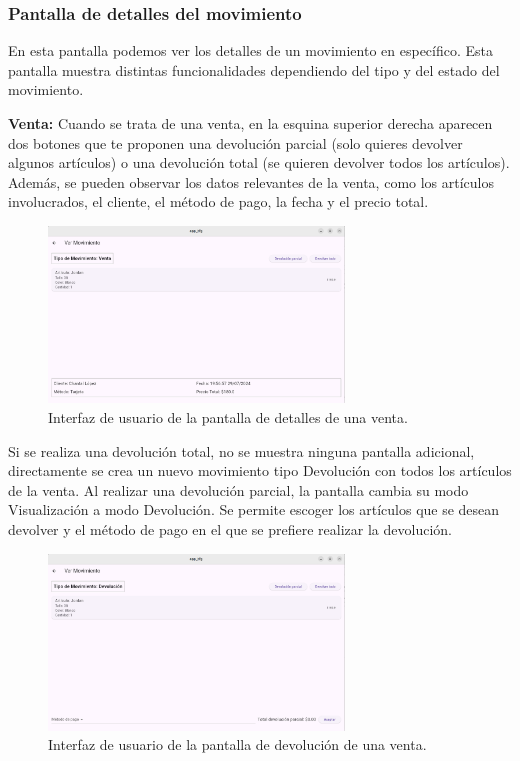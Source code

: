 \subsubsection{Pantalla de detalles del movimiento}

En esta pantalla podemos ver los detalles de un movimiento en específico. Esta pantalla muestra distintas funcionalidades dependiendo del tipo y del estado del movimiento. 

\textbf{Venta:} Cuando se trata de una venta, en la esquina superior derecha aparecen dos botones que te proponen una devolución parcial (solo quieres devolver algunos artículos) o una devolución total (se quieren devolver todos los artículos). Además, se pueden observar los datos relevantes de la venta, como los artículos involucrados, el cliente, el método de pago, la fecha y el precio total. 

\begin{figure}[H]
	\centering
	\includegraphics[width=0.7\textwidth]{imagenes/SegundaIteracion/detallesVenta.png}
	\caption{Interfaz de usuario de la pantalla de detalles de una venta.}
	\label{fig:appPantallaDetalleVenta}
\end{figure}

Si se realiza una devolución total, no se muestra ninguna pantalla adicional, directamente se crea un nuevo movimiento tipo Devolución con todos los artículos de la venta. Al realizar una devolución parcial, la pantalla cambia su modo Visualización a modo Devolución. Se permite escoger los artículos que se desean devolver y el método de pago en el que se prefiere realizar la devolución. 

\begin{figure}[H]
	\centering
	\includegraphics[width=0.7\textwidth]{imagenes/SegundaIteracion/devolucionVenta.png}
	\caption{Interfaz de usuario de la pantalla de devolución de una venta.}
	\label{fig:appPantallaDevolucionVenta}
\end{figure}

